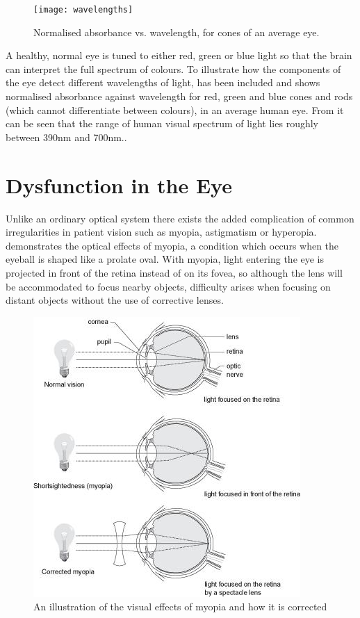  \begin{figure}[H]
\centering
  \texttt{[image: wavelengths]}
\caption{Normalised absorbance vs. wavelength, for cones of an average eye.\cite{wikicones}}
\label{fig:wavelengths}
\end{figure}

A healthy, normal eye is tuned to either red, green or blue light so that the
brain can interpret the full spectrum of colours. To illustrate how the
components of the eye detect different wavelengths of light,
 has been included and shows normalised absorbance
against wavelength for red, green and blue cones and rods (which cannot
differentiate between colours), in an average human eye.  From
 it can be seen that the range of human visual spectrum
of light lies roughly between 390nm and 700nm.\cite{starr2010biology}.


\section{Dysfunction in the Eye}

Unlike an ordinary optical system there exists the added complication
of common irregularities in patient vision such as myopia, astigmatism
or hyperopia.  demonstrates the optical effects of myopia,
a condition which occurs when the eyeball is shaped like a prolate oval.
\cite{saine2002ophthalmic} With myopia, light entering the eye is projected
in front of the retina instead of on its fovea, so although the lens will be
accommodated to focus nearby objects, difficulty arises when focusing on 
distant objects without the use of corrective lenses.

\begin{figure}[htbp]
\centering
\includegraphics{figures/myopia}
\caption{An illustration of the visual effects of myopia and how it is corrected}
\label{fig:myop}
\end{figure}

